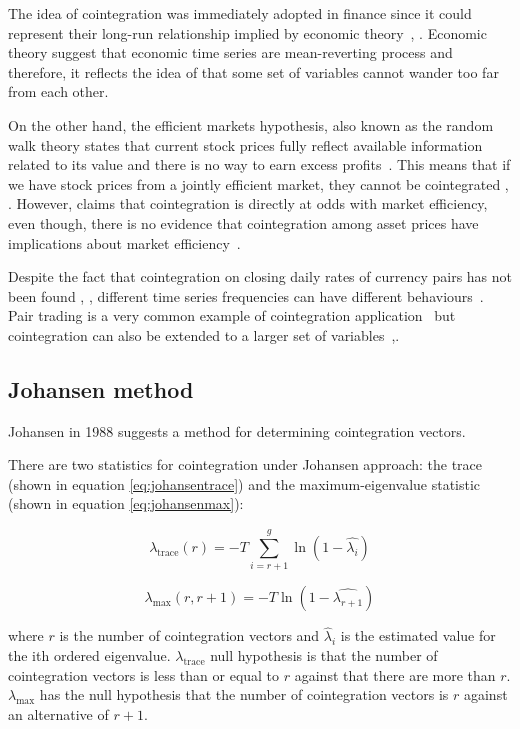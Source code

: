 The idea of cointegration was immediately adopted in finance since it could
represent their long-run relationship implied by economic
theory~\cite{laietAl1991}, \cite{lence+falk2005}.  Economic theory suggest that
economic time series are mean-reverting process and therefore, it reflects the
idea of that some set of variables cannot wander too far from each other. 

On the other hand, the efficient markets hypothesis, also known as the random
walk theory states that current stock prices fully reflect available information
related to its value and there is no way to earn excess profits~\cite{fama1970}.
This means that if we have stock prices from a jointly efficient market, they
cannot be cointegrated \cite{granger1986}, \cite{dwyer1992}. However,
\cite{richards1995} claims that cointegration is directly at odds with market
efficiency, even though, there is no evidence that cointegration among asset
prices have implications about market efficiency~\cite{lence+falk2005}.

Despite the fact that cointegration on closing daily rates of currency pairs has
not been found \cite{coleman1990}, \cite{copeland1991}, different time series
frequencies can have different behaviours~\cite{aldridge2009}. Pair trading is a
very common example of cointegration application~\cite{herlemont2003} but
cointegration can also be extended to a larger set of
variables~\cite{mukherjee1995},\cite{engle2004}.

\subsection{Johansen method}
Johansen in 1988 \cite{johansen1988} suggests a method for determining
cointegration vectors. 

There are two statistics for cointegration under Johansen approach: the trace
(shown in equation \ref{eq:johansentrace}) and the maximum-eigenvalue statistic
(shown in equation \ref{eq:johansenmax}):

\begin{equation}
\label{eq:johansentrace}
\lambda_{\text{trace}} (r) = -T \sum_{i=r+1}^g \ln(1-\hat{\lambda_i})
\end{equation}


\begin{equation}
\label{eq:johansenmax}
\lambda_{\text{max}} (r,r+1) = -T \ln(1-\hat{\lambda_{r+1}})
\end{equation}


\noindent where $r$ is the number of cointegration vectors and
$\hat{\lambda}_i$ is the estimated value for the ith ordered eigenvalue.
$\lambda_{\text{trace}}$ null hypothesis is that the number of cointegration
vectors is less than or equal to $r$ against that there are more than $r$.
$\lambda_{\text{max}}$ has the null hypothesis that the number of cointegration
vectors is $r$ against an alternative of $r +1$.

